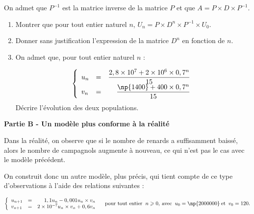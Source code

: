 \documentclass{cornouaille}
\begin{document}
\begin{exercice}
\begin{enumerate}
On admet que $P^{- 1}$ est la matrice inverse de la matrice $P$ et que $A = P \times D \times P^{- 1}$.
	\begin{enumerate}
		\item Montrer que pour tout entier naturel $n$,\: $U_n = P \times D^n \times P^{- 1} \times U_0$.
		\item Donner sans justification l'expression de la matrice $D^n$ en fonction de $n$.
		\item On admet que, pour tout entier naturel $n$ :
	
\renewcommand\arraystretch{1.8}	
\[\left\{\begin{array}{l c r}
u_n &=& \dfrac{2,8 \times 10^7 + 2 \times 10^6 \times 0,7^n}{15}\\

v_n &=&\dfrac{\np{1400} + 400 \times 0,7^n}{15}
		\end{array}\right.\]
\renewcommand\arraystretch{1}	
Décrire l'évolution des deux populations.
	\end{enumerate}
\end{enumerate}

\bigskip

\textbf{Partie B - Un modèle plus conforme à la réalité}

\medskip

Dans la réalité, on observe que si le nombre de renards a suffisamment baissé, alors le nombre de
campagnols augmente à nouveau, ce qui n'est pas le cas avec le modèle précédent. 

On construit donc un autre modèle, plus précis, qui tient compte de ce type d'observations à l'aide des relations suivantes :

\[\left\{\begin{array}{l c r}
u_{n+1} &=& 1,1u_n - 0,001u_n \times v_n\\
v_{n+1} &=& 2 \times 10^{-7} u_n \times v_n + 0,6v_n
\end{array}\right.\quad \text{pour tout entier }\:n \geqslant 0,\: \text{avec }\:u_0 = \np{2000000}\: \text{et }\: v_0 = 120.\]

\medskip


\end{exercice}
\end{document}
